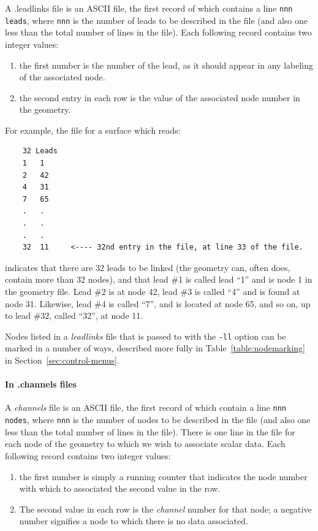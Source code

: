 A .leadlinks file is an ASCII file, the first record of which
contains a line {\tt nnn leads}, where {\tt nnn} is the number of leads to
be described in the file (and also one less than the total number of lines
in the file).  Each following record contains two integer values:\\
%
\begin{enumerate}
  \item the first number is the number of the lead, as it should appear in
        any labeling of the associated node.
  \item the second entry in each row is the value of the associated node
        number in the geometry.  
 \end{enumerate}
%
For example, the file for a surface which reads:
%
\begin{verbatim}
    32 Leads
    1   1   
    2   42  
    4   31  
    7   65  
    .   .   
    .   .   
    .   .   
    32  11     <---- 32nd entry in the file, at line 33 of the file.
\end{verbatim}
%
indicates that there are 32 leads to be linked (the geometry can, often
does, contain more than 32 nodes), and that lead \#1 is called lead ``1''
and is node 1 in the geometry file.  Lead \#2 is at node 42, lead \#3 is
called ``4'' and is found at node 31.  Likewise, lead \#4 is called ``7'',
and is located at node 65, and so on, up to lead \#32, called ``32'', at
node 11.

Nodes listed in a {\em leadlinks} file that is passed to \map{} with the
{\tt -ll} option can be marked in a number of ways, described more fully in
Table~\ref{table:nodemarking} in Section~\ref{sec:control-menus}.

\paragraph{In .channels files}

A \emph{channels} file is an ASCII file, the first record of which contain a
line {\tt nnn nodes}, where {\tt nnn} is the number of nodes to be
described in the file (and also one less than the total number of lines in
the file).  There is one line in the file for each node of the geometry to
which we wish to associate scalar data.   Each following record contains
two integer values:\\ 
%
\begin{enumerate}
  \item the first number is simply a running counter that indicates
        the node number with which to associated the second value in the
        row.
  \item The second value in each row is the {\em channel\/} number for
        that node; a negative number signifies a node to which there is no
        data associated.
\end{enumerate}

